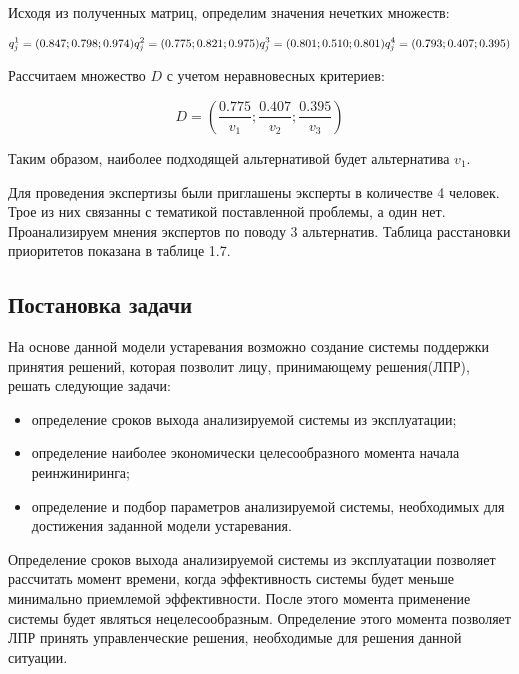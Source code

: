 Исходя из полученных матриц, определим значения нечетких множеств:

\begin{equation}
    q^1_j=(0.847;0.798;0.974) \\
    q^2_j=(0.775;0.821;0.975) \\
    q^3_j=(0.801;0.510;0.801) \\
    q^4_j=(0.793;0.407;0.395) \\
\end{equation}

Рассчитаем множество $D$ с учетом неравновесных критериев:

\begin{equation}
    D=(\frac{0.775}{v_1};\frac{0.407}{v_2};\frac{0.395}{v_3})
\end{equation}

Таким образом, наиболее подходящей альтернативой будет альтернатива $v_1$.

Для проведения экспертизы были приглашены эксперты в количестве 4 человек. Трое из них связанны с тематикой поставленной проблемы, а один нет.
Проанализируем мнения экспертов по поводу 3 альтернатив. Таблица расстановки приоритетов показана в таблице 1.7. 

\subsection{Постановка задачи}
На основе данной модели устаревания возможно создание системы поддержки принятия решений, которая позволит лицу, принимающему решения(ЛПР), решать следующие задачи:
\begin{itemize}
    \item определение сроков выхода анализируемой системы из эксплуатации;
    \item определение наиболее экономически целесообразного момента начала реинжиниринга;
    \item определение и подбор параметров анализируемой системы, необходимых для достижения заданной модели устаревания.
\end{itemize}

Определение сроков выхода анализируемой системы из эксплуатации позволяет рассчитать момент времени, когда эффективность системы будет меньше минимально приемлемой эффективности. 
После этого момента применение системы будет являться нецелесообразным. Определение этого момента позволяет ЛПР принять управленческие решения, необходимые для решения данной ситуации.

